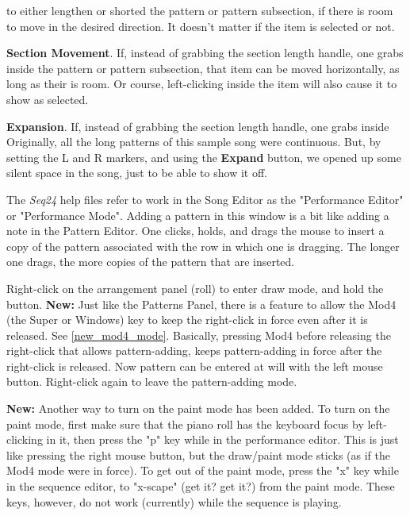 \begin{enumber}
         to either lengthen or shorted the pattern or pattern subsection, if
         there is room to move in the desired direction.
         It doesn't matter if the item is selected or not.
      \item \textbf{Section Movement}.
         If, instead of grabbing the section length handle, one grabs inside
         the pattern or pattern subsection, that item can be moved
         horizontally, as long as their is room.  Or course, left-clicking
         inside the item will also cause it to show as selected.
      \item \textbf{Expansion}.
         If, instead of grabbing the section length handle, one grabs inside
         Originally, all the long patterns of this sample song were continuous.
         But, by setting the L and R markers, and using the \textbf{Expand}
         button, we opened up some silent space in the song, just to be able
         to show it off.
   \end{enumber}

   The \textsl{Seq24} help files refer to work in the Song Editor as the
   "Performance Editor" or "Performance Mode".  Adding a pattern in this
   window is a bit like adding a note in the Pattern Editor.
   One clicks, holds, and drags the mouse to insert a copy of the pattern
   associated with the row in which one is dragging.  The longer one drags,
   the more copies of the pattern that are inserted.

	Right-click on the arrangement panel (roll) to enter
   draw mode, and hold the button.
   \textbf{New:}
   Just like the Patterns Panel, there is a feature to allow the Mod4 (the
   Super or Windows) key to keep the right-click in force even after it is
   released.  See \ref{new_mod4_mode}.  Basically, pressing Mod4 before
   releasing the right-click that allows pattern-adding, keeps
   pattern-adding in force after the right-click is released.  Now pattern
   can be entered at will with the left mouse button.  Right-click again to
   leave the pattern-adding mode.

   \textbf{New:}
   Another way to turn on the paint mode has been added.
   To turn on the paint mode, first make sure that the piano roll has the
   keyboard focus by left-clicking in it, then press the
   "p" key while in the performance editor.
   This is just like pressing the right mouse button, but the draw/paint mode
   sticks (as if the Mod4 mode were in force).
   To get out of the paint mode, press the
   "x" key while in the sequence editor, to "x-scape" (get it?  get it?)
   from the paint mode.
   These keys, however, do not work (currently) while the sequence is playing.

